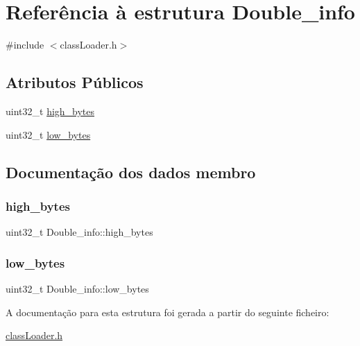 \hypertarget{struct_double__info}{}\section{Referência à estrutura Double\+\_\+info}
\label{struct_double__info}


{\ttfamily \#include $<$class\+Loader.\+h$>$}

\subsection*{Atributos Públicos}
\begin{DoxyCompactItemize}
\item 
uint32\+\_\+t \hyperlink{struct_double__info_a1c5a1903d681e8604c3fbf1849cc396e}{high\+\_\+bytes}
\item 
uint32\+\_\+t \hyperlink{struct_double__info_a12ceb34163d42f5cca82814511079438}{low\+\_\+bytes}
\end{DoxyCompactItemize}


\subsection{Documentação dos dados membro}
\hypertarget{struct_double__info_a1c5a1903d681e8604c3fbf1849cc396e}{}\label{struct_double__info_a1c5a1903d681e8604c3fbf1849cc396e} 
\subsubsection{\texorpdfstring{high\+\_\+bytes}{high\_bytes}}
{\footnotesize\ttfamily uint32\+\_\+t Double\+\_\+info\+::high\+\_\+bytes}

\hypertarget{struct_double__info_a12ceb34163d42f5cca82814511079438}{}\label{struct_double__info_a12ceb34163d42f5cca82814511079438} 
\subsubsection{\texorpdfstring{low\+\_\+bytes}{low\_bytes}}
{\footnotesize\ttfamily uint32\+\_\+t Double\+\_\+info\+::low\+\_\+bytes}



A documentação para esta estrutura foi gerada a partir do seguinte ficheiro\+:\begin{DoxyCompactItemize}
\item 
\hyperlink{class_loader_8h}{class\+Loader.\+h}\end{DoxyCompactItemize}
